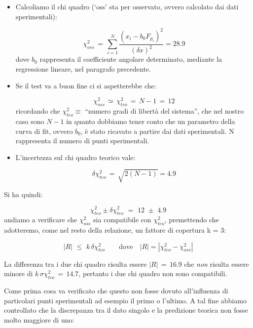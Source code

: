\begin{itemize}
\item{Calcoliamo il chi quadro (`oss' sta per osservato, ovvero calcolato dai dati sperimentali):

	\begin{equation*}
        \chi_{oss}^2 \,=\, \sum_{i=1}^{N} \frac{(x_i - b_0 F_{p_i})^2}{(\delta x)^2} = 28.9
	\end{equation*}
	dove $b_0$ rappresenta il coefficiente angolare determinato, mediante la regressione lineare, nel paragrafo precedente.}
\item{Se il test va a buon fine ci si aspetterebbe che:

	\begin{equation*}
		\chi_{oss}^2 \, \simeq \, \chi_{teo}^2 \,=\, N - 1 \,=\, 12
	\end{equation*}
	ricordando che $\chi_{teo}^2 \equiv$ ``numero gradi di libertà del sistema'', che nel nostro caso sono $N - 1$ in
    quanto dobbiamo tener conto che un parametro della curva di fit, ovvero $b_0$, è stato ricavato a partire dai dati
    sperimentali. N rappresenta il numero di punti sperimentali.}
\item{L'incertezza sul chi quadro teorico vale:

    \begin{equation*}
        \delta\chi_{teo}^2 \,=\, \sqrt{2(N - 1)} = 4.9
	\end{equation*}

    }
\end{itemize}
%
Si ha quindi:

\begin{equation*}
	\chi_{teo}^2 \pm \delta\chi_{teo}^2 \,\,=\,\, 12 \,\,\pm\,\, 4.9
\end{equation*}
%
andiamo a verificare che $\chi_{oss}^2$ sia compatibile con $\chi_{teo}^2$, premettendo che adotteremo, come
nel resto della relazione, un fattore di copertura k = 3:

\begin{equation*}
	|R| \,\, \leq \,\, k \, \delta\chi_{teo}^2 \qquad \text{dove} \quad |R| = |\chi_{teo}^2 - \chi_{oss}^2|
\end{equation*}
%

La differenza tra i due chi quadro risulta essere $|R| \,=\, 16.9$ che \emph{non} risulta essere minore di
$k \, \sigma \chi_{teo}^2 \,=\, 14.7$, pertanto i due chi quadro non sono compatibili.

Come prima cosa va verificato che questo non fosse dovuto all'influenza di particolari punti sperimentali ad esempio il primo o l'ultimo.
A tal fine abbiamo controllato che la discrepanza tra il dato singolo e la predizione teorica non fosse molto maggiore di uno:

